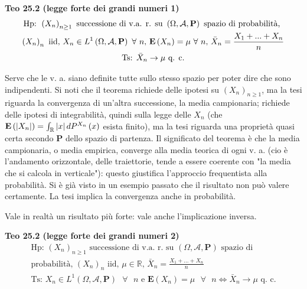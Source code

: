 \documentclass{article}
\begin{document}
\textbf{Teo 25.2 (legge forte dei grandi numeri 1)}%
\begin{gather*}
\text{Hp: }\left( X_{n}\right) _{n\geq 1}\text{ successione di v.a. r. su }%
\left( \Omega ,\mathcal{A},\mathbf{P}\right) \text{ spazio di probabilit\`{a}%
, } \\
\left( X_{n}\right) _{n}\text{ iid, }X_{n}\in L^{1}\left( \Omega ,\mathcal{A}%
,\mathbf{P}\right) \text{ }\forall \text{ }n\text{, }\mathbf{E}\left(
X_{n}\right) =\mu \text{ }\forall \text{ }n\text{, }\bar{X}_{n}=\frac{%
X_{1}+...+X_{n}}{n} \\
\text{Ts: }\bar{X}_{n}\rightarrow \mu \text{ q. c.}
\end{gather*}

Serve che le v. a. siano definite tutte sullo stesso spazio per poter dire
che sono indipendenti. Si noti che il teorema richiede delle ipotesi su $%
\left( X_{n}\right) _{n\geq 1}$, ma la tesi riguarda la convergenza di
un'altra successione, la media campionaria; richiede delle ipotesi di
integrabilit\`{a}, quindi sulla legge delle $X_{n}$ (che $\mathbf{E}\left(
\left\vert X_{n}\right\vert \right) =\int_{%
\mathbb{R}
}\left\vert x\right\vert dP^{X_{n}}\left( x\right) $ esista finito), ma la
tesi riguarda una propriet\`{a} quasi certa secondo $\mathbf{P}$ dello
spazio di partenza. Il significato del teorema \`{e} che la media
campionaria, o media empirica, converge alla media teorica di ogni v. a. (cio%
\`{e} l'andamento orizzontale, delle traiettorie, tende a essere coerente
con "la media che si calcola in verticale"): questo giustifica l'approccio
frequentista alla probabilit\`{a}. Si \`{e} gi\`{a} visto in un esempio
passato che il risultato non pu\`{o} valere certamente. La tesi implica la
convergenza anche in probabilit\`{a}.

Vale in realt\`{a} un risultato pi\`{u} forte: vale anche l'implicazione
inversa.

\textbf{Teo 25.2 (legge forte dei grandi numeri 2)}%
\begin{gather*}
\text{Hp: }\left( X_{n}\right) _{n\geq 1}\text{ successione di v.a. r. su }%
\left( \Omega ,\mathcal{A},\mathbf{P}\right) \text{ spazio di } \\
\text{probabilit\`{a}, }\left( X_{n}\right) _{n}\text{ iid, }\mu \in 
\mathbb{R}
\text{, }\bar{X}_{n}=\frac{X_{1}+...+X_{n}}{n} \\
\text{Ts: }X_{n}\in L^{1}\left( \Omega ,\mathcal{A},\mathbf{P}\right) \text{ 
}\forall \text{ }n\text{ e }\mathbf{E}\left( X_{n}\right) =\mu \text{ }%
\forall \text{ }n\Longleftrightarrow \bar{X}_{n}\rightarrow \mu \text{ q. c.}
\end{gather*}
\end{document}
